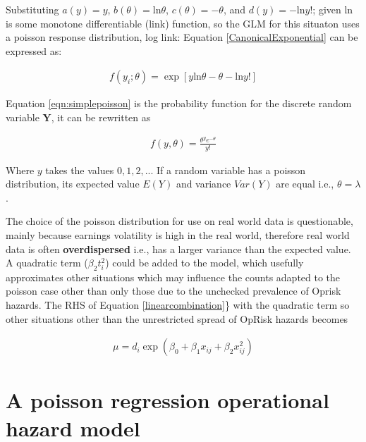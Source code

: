 \documentclass[]{article}
\begin{document}
Substituting \(a(y)=y\), \(b(\theta) = \mbox{ln}\theta\),
\(c(\theta) = -\theta\), and \(d(y) = -\mbox{ln}y!\); given
\(\mbox{ln}\) is some monotone differentiable (link) function, so the
GLM for this situaton uses a poisson response distribution, log link:
Equation \ref{CanonicalExponential} can be expressed as:

\singlespacing

\begin{eqnarray}\label{eqn:simplepoisson}
f(y_i;\theta) = \exp{\left[y\mbox{ln}\theta - \theta -\mbox{ln}y!\right]}
\end{eqnarray} \doublespacing

Equation \ref{eqn:simplepoisson} is the probability function for the
discrete random variable \(\mathbf{Y}\), it can be rewritten as

\singlespacing

\begin{eqnarray}\label{POISSON}
f(y,\theta) = \frac{\theta^ye^{-\theta}}{y!}
\end{eqnarray} \doublespacing

Where \(y\) takes the values \(0,1,2,..\). If a random variable has a
poisson distribution, its expected value \(E(Y)\) and variance
\(Var(Y)\) are equal i.e., \(\theta =\lambda\).\medskip

The choice of the poisson distribution for use on real world data is
questionable, mainly because earnings volatility is high in the real
world, therefore real world data is often \textbf{overdispersed} i.e.,
has a larger variance than the expected value. A quadratic term
(\(\beta_2t_i^2\)) could be added to the model, which usefully
approximates other situations which may influence the counts adapted to
the poisson case other than only those due to the unchecked prevalence
of Oprisk hazards. The RHS of Equation \ref{linearcombination}\} with
the quadratic term so other situations other than the unrestricted
spread of OpRisk hazards becomes

\singlespacing

\begin{eqnarray}\label{eqn:adaptedpoisson}
\mu = d_i\exp{(\beta_0 + \beta_1x_{ij} + \beta_2x_{ij}^2)} 
\end{eqnarray} \doublespacing

\section{A poisson regression operational hazard model}
\label{sec:A poisson regression operational hazard model}
\end{document}
